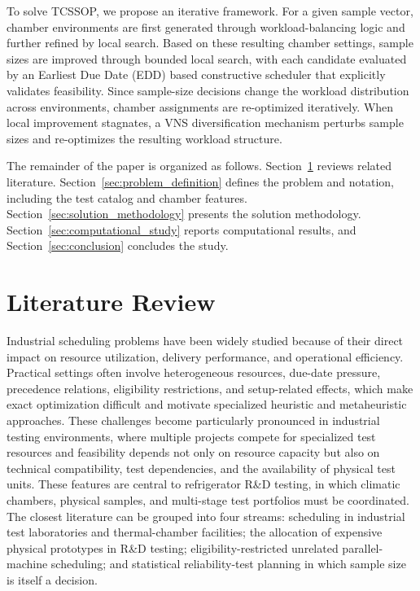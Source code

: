 \documentclass[11pt]{article}
\begin{document}
To solve TCSSOP, we propose an iterative framework. For a given sample vector, chamber environments are first generated through workload-balancing logic and further refined by local search. Based on these resulting chamber settings, sample sizes are improved through bounded local search, with each candidate evaluated by an Earliest Due Date (EDD) based constructive scheduler that explicitly validates feasibility. Since sample-size decisions change the workload distribution across environments, chamber assignments are re-optimized iteratively. When local improvement stagnates, a VNS diversification mechanism perturbs sample sizes and re-optimizes the resulting workload structure.

The remainder of the paper is organized as follows. Section~\ref{sec:literature_review} reviews related literature. Section~\ref{sec:problem_definition} defines the problem and notation, including the test catalog and chamber features. Section~\ref{sec:solution_methodology} presents the solution methodology. Section~\ref{sec:computational_study} reports computational results, and Section~\ref{sec:conclusion} concludes the study.

\section{Literature Review}
\label{sec:literature_review}


Industrial scheduling problems have been widely studied because of their
direct impact on resource utilization, delivery performance, and operational
efficiency.
Practical settings often involve heterogeneous resources, due-date pressure,
precedence relations, eligibility restrictions, and setup-related effects,
which make exact optimization difficult and motivate specialized heuristic
and metaheuristic approaches.
These challenges become particularly pronounced in industrial testing
environments, where multiple projects compete for specialized test resources
and feasibility depends not only on resource capacity but also on technical
compatibility, test dependencies, and the availability of physical test units.
These features are central to refrigerator {R\&D} testing, in which climatic
chambers, physical samples, and multi-stage test portfolios must be
coordinated.
The closest literature can be grouped into four streams: scheduling in
industrial test laboratories and thermal-chamber facilities; the allocation
of expensive physical prototypes in {R\&D} testing; eligibility-restricted
unrelated parallel-machine scheduling; and statistical reliability-test
planning in which sample size is itself a decision.
\end{document}

